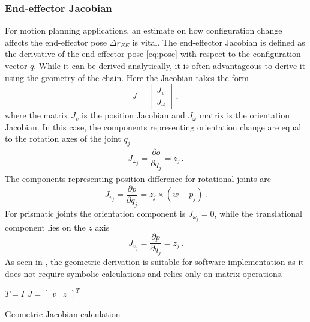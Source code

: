 \documentclass[times, utf8, diplomski, english]{fer}
\begin{document}
\subsubsection{End-effector Jacobian}
For motion planning applications, an estimate on how configuration change affects the end-effector pose $\Delta r_{EE}$ is vital.
The end-effector Jacobian is defined as the derivative of the end-effector pose \eqref{eq:pose} with respect to the configuration vector $q$.
While it can be derived analytically, it is often advantageous to derive it using the geometry of the chain.
Here the Jacobian takes the form 
\begin{equation}
J =
\begin{bmatrix}
J_{v} \\ 
J_{\omega}
\end{bmatrix}\, ,
\label{jacob1}
\end{equation}
where the matrix $J_v$ is the position Jacobian and $J_{\omega}$ matrix is the orientation Jacobian.
In this case, the components representing orientation change are equal to the rotation axes of the joint $q_j$
\begin{align}
J_{\omega_j} = \dfrac{\partial o}{\partial q_j} = z_{j}\, .
\end{align}
The components representing position difference for rotational joints are
\begin{equation}
J_{v_j} = \dfrac{\partial p}{ \partial q_{j}} = z_j \times (w - p_j)\, .
\end{equation}
For prismatic joints the orientation component is $J_{\omega_j} = 0$, while the translational component lies on the $z$ axis
\begin{equation}
J_{v_j} = \dfrac{\partial p}{ \partial q_j} = z_j\, .
\end{equation}
As seen in , the geometric derivation is suitable for software implementation as it does not require symbolic calculations and relies only on matrix operations.
\begin{algorithm}[h]
 $T=I$\;
 $J = \begin{bmatrix}v &z \end{bmatrix}^T$ 
 \caption{Geometric Jacobian calculation}
 \label{algorithm:jacobian calc}
\end{algorithm}
\end{document}
